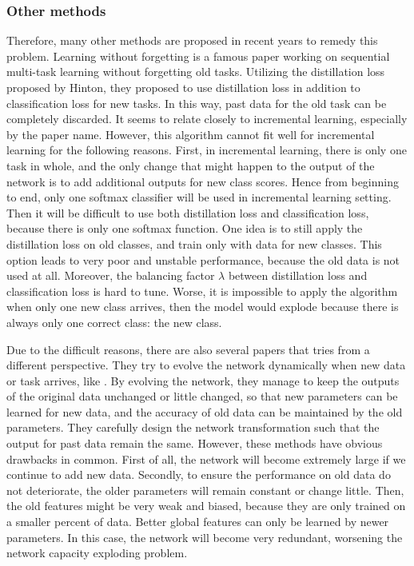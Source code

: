 \subsubsection{Other methods}
Therefore, many other methods are proposed in recent years to remedy this problem. Learning without forgetting\cite{li2017learning} is a famous paper working on sequential multi-task learning without forgetting old tasks.
Utilizing the distillation loss proposed by Hinton\cite{hinton2015distilling}, they proposed to use distillation loss in addition to classification loss for new tasks. In this way, past data for the old task can be completely discarded. It seems to relate closely to incremental learning, especially by the paper name. However, this algorithm cannot fit well for incremental learning for the following reasons. First, in incremental learning, there is only one task in whole, and the only change that might happen to the output of the network is to add additional outputs for new class scores. Hence from beginning to end, only one softmax classifier will be used in incremental learning setting. Then it will be difficult to use both distillation loss and classification loss, because there is only one softmax function. One idea is to still apply the distillation loss on old classes, and train only with data for new classes. This option leads to very poor and unstable performance, because the old data is not used at all. Moreover, the balancing factor $\lambda$ between distillation loss and classification loss is hard to tune. Worse, it is impossible to apply the algorithm when only one new class arrives, then the model would explode because there is always only one correct class: the new class.

Due to the difficult reasons, there are also several papers that tries from a different perspective. They try to evolve the network dynamically when new data or task arrives, like \cite{yoon2017lifelong,rosenfeld2017incremental,sarwar2017incremental,rusu2016progressive}. By evolving the network, they manage to keep the outputs of the original data unchanged or little changed, so that new parameters can be learned for new data, and the accuracy of old data can be maintained by the old parameters. They carefully design the network transformation such that the output for past data remain the same. However, these methods have obvious drawbacks in common. First of all, the network will become extremely large if we continue to add new data. Secondly, to ensure the performance on old data do not deteriorate, the older parameters will remain constant or change little. Then, the old features might be very weak and biased, because they are only trained on a smaller percent of data. Better global features can only be learned by newer parameters. In this case, the network will become very redundant, worsening the network capacity exploding problem.


